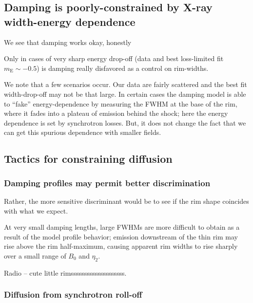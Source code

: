 \documentclass[iop, apj, numberedappendix]{emulateapj}
\newcommand*{\mt}{\mathrm}
\newcommand*{\mE}{m_\mt{E}}
\begin{document}
\subsection{Damping is poorly-constrained by X-ray width-energy dependence}

We see that damping works okay, honestly

Only in cases of very sharp energy drop-off (data and best loss-limited fit
$\mE \sim -0.5$) is damping really disfavored as a control on rim-widths.

We note that a few scenarios occur.  Our data are fairly scattered and the best
fit width-drop-off may not be that large.  In certain cases the damping model
is able to ``fake'' energy-dependence by measuring the FWHM at the base of the
rim, where it fades into a plateau of emission behind the shock; here the
energy dependence is set by synchrotron losses.  But, it does not change the
fact that we can get this spurious dependence with smaller fields.

\subsection{Tactics for constraining diffusion}

\subsubsection{Damping profiles may permit better discrimination}

Rather, the more sensitive discriminant would be to see if the rim shape
coincides with what we expect.

At very small damping lengths, large FWHMs
are more difficult to obtain as a result of the model profile behavior;
emission downstream of the thin rim may rise above the rim half-maximum,
causing apparent rim widths to rise sharply over a small range of $B_0$ and
$\eta_2$.

Radio -- cute little rimssssssssssssssssssss.

\subsubsection{Diffusion from synchrotron roll-off}
\end{document}
